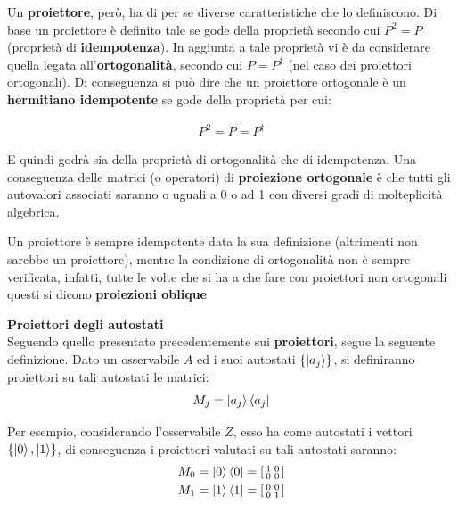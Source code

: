 \begin{info}
Un \textbf{proiettore}, però, ha di per se diverse caratteristiche che lo definiscono. Di base un proiettore è definito tale se gode della proprietà secondo cui \(P^2=P\) (proprietà di \textbf{idempotenza}). In aggiunta a tale proprietà vi è da considerare quella legata all'\textbf{ortogonalità}, secondo cui \(P=P^\dagger\) (nel caso dei proiettori ortogonali). Di conseguenza si può dire che un proiettore ortogonale è un \textbf{hermitiano idempotente} se gode della proprietà per cui:

\begin{gather*}
P^2 = P = P^\dagger
\end{gather*}

E quindi godrà sia della proprietà di ortogonalità che di idempotenza. Una conseguenza delle matrici (o operatori) di \textbf{proiezione ortogonale} è che tutti gli autovalori associati saranno o uguali a 0 o ad 1 con diversi gradi di molteplicità algebrica.

\begin{warn}
Un proiettore è sempre idempotente data la sua definizione (altrimenti non sarebbe un proiettore), mentre la condizione di ortogonalità non è sempre verificata, infatti, tutte le volte che si ha a che fare con proiettori non ortogonali questi si dicono \textbf{proiezioni oblique}
\end{warn}
\end{info}

\begin{info}
\textbf{Proiettori degli autostati}\\
Seguendo quello presentato precedentemente sui \textbf{proiettori}, segue la seguente definizione.
Dato un osservabile \(A\) ed i suoi autostati \(\{\ket{a_j}\}\), si definiranno proiettori su tali autostati le matrici:
\begin{gather*}
M_j = \ket{a_j} \bra{a_j}
\end{gather*}

Per esempio, considerando l'osservabile \(Z\), esso ha come autostati i vettori \(\{\ket{0}, \ket{1}\}\), di conseguenza i proiettori valutati su tali autostati saranno:
\begin{gather*}
M_0 = \ket{0}\bra{0} = 
\left[\begin{smallmatrix}
1 & 0\\
0 & 0       
\end{smallmatrix}\right]\\
M_1 = \ket{1}\bra{1}=
\left[\begin{smallmatrix}
0 & 0 \\
0 & 1 
\end{smallmatrix}\right]
\end{gather*}
\end{info}

